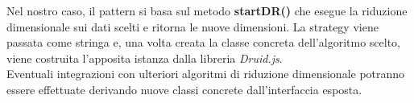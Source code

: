 Nel nostro caso, il pattern si basa sul metodo \textbf{startDR()} che esegue la riduzione dimensionale sui dati scelti e ritorna le nuove dimensioni. La strategy viene passata come stringa e, una volta creata la classe concreta dell'algoritmo scelto, viene costruita l'apposita istanza dalla libreria \textit{Druid.js}.\\Eventuali integrazioni con ulteriori algoritmi di riduzione dimensionale potranno essere effettuate derivando nuove classi concrete dall'interfaccia esposta.